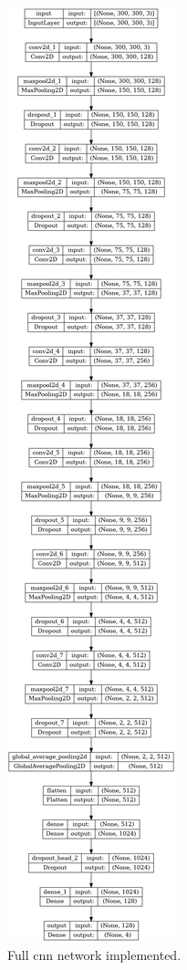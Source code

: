 \documentclass[conference]{IEEEtran}
\begin{document}
\begin{figure}[htp]
    \centering
    \includegraphics[height=0.95\textheight]{imgs/model_plot_cnn.png}
    \caption{Full \gls{cnn} network implemented.}
    \label{fig:subnetwork_cnn}
\end{figure}
\end{document}
